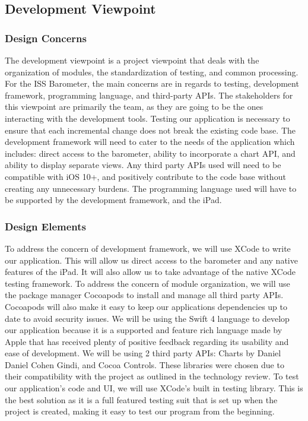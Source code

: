 \documentclass[onecolumn, draftclsnofoot,10pt, compsoc]{IEEEtran}
\begin{document}
\subsection{Development Viewpoint}
\subsubsection{Design Concerns}
The development viewpoint is a project viewpoint that deals with the organization of modules, the standardization of testing, and common processing.
For the ISS Barometer, the main concerns are in regards to testing, development framework, programming language, and third-party APIs.
The stakeholders for this viewpoint are primarily the team, as they are going to be the ones interacting with the development tools.
Testing our application is necessary to ensure that each incremental change does not break the existing code base.
The development framework will need to cater to the needs of the application which includes: direct access to the barometer, ability to incorporate a chart API, and ability to display separate views.
Any third party APIs used will need to be compatible with iOS 10+, and positively contribute to the code base without creating any unnecessary burdens.
The programming language used will have to be supported by the development framework, and the iPad.

\subsubsection{Design Elements}
To address the concern of development framework, we will use XCode to write our application.
This will allow us direct access to the barometer and any native features of the iPad.
It will also allow us to take advantage of the native XCode testing framework.
To address the concern of module organization, we will use the package manager Cocoapods to install and manage all third party APIs.
Cocoapods will also make it easy to keep our applications dependencies up to date to avoid security issues.
We will be using the Swift 4 language to develop our application because it is a supported and feature rich language made by Apple that has received plenty of positive feedback regarding its usability and ease of development.
We will be using 2 third party APIs: Charts by Daniel Daniel Cohen Gindi, and Cocoa Controls.
These libraries were chosen due to their compatibility with the project as outlined in the technology review.
To test our application's code and UI, we will use XCode's built in testing library.
This is the best solution as it is a full featured testing suit that is set up when the project is created, making it easy to test our program from the beginning.
\end{document}
